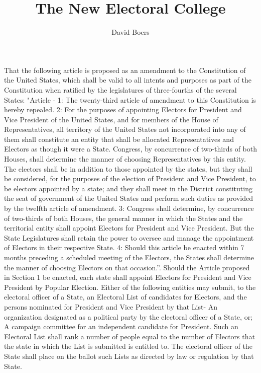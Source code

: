 \documentclass{article}
\title{The New Electoral College}
\author{David Boers}
\begin{document}
    \subject{To propose an Amendment to the Constitution of the United States to modify the Electoral College and for other purposes.}
    That the following article is proposed as an amendment to the Constitution of the United States, which shall be valid to all intents and purposes as part of the Constitution when ratified by the legislatures of three-fourths of the several States:
    "Article -
    1: The twenty-third article of amendment to this Constitution is hereby repealed.
    2: For the purposes of appointing Electors for President and Vice President of the United States, and for members of the House of Representatives, all territory of the United States not incorporated into any of them shall constitute an entity that shall be allocated Representatives and Electors as though it were a State. Congress, by concurrence of two-thirds of both Houses, shall determine the manner of choosing Representatives by this entity. The electors shall be in addition to those appointed by the states, but they shall be considered, for the purposes of the election of President and Vice President, to be electors appointed by a state; and they shall meet in the District constituting the seat of government of the United States and perform such duties as provided by the twelfth article of amendment.
    3: Congress shall determine, by concurrence of two-thirds of both Houses, the general manner in which the States and the territorial entity shall appoint Electors for President and Vice President. But the State Legislatures shall retain the power to oversee and manage the appointment of Electors in their respective State. 
    4: Should this article be enacted within 7 months preceding a scheduled meeting of the Electors, the States shall determine the manner of choosing Electors on that occasion.”.
    Should the Article proposed in Section 1 be enacted, each state shall appoint Electors for President and Vice President by Popular Election. 
    Either of the following entities may submit, to the electoral officer of a State, an Electoral List of candidates for Electors, and the persons nominated for President and Vice President by that List-
    An organization designated as a political party by the electoral officer of a State, or;
    A campaign committee for an independent candidate for President.
    Such an Electoral List shall rank a number of people equal to the number of Electors that the state in which the List is submitted is entitled to. 
    The electoral officer of the State shall place on the ballot such Lists as directed by law or regulation by that State. 
\end{document}
